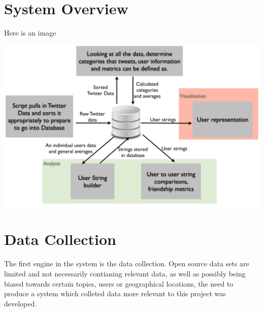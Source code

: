 \section{System Overview}
Here is an image 
\begin{center}
		\includegraphics[scale = 0.55]{./images/architecture.png}
\end{center}
\section{Data Collection}
The first engine in the system is the data collection. Open source data sets are limited and not necessarily contianing relevant data, as well as possibly being biased towards certain topics, users or geographical locations, the need to produce a system which colleted data more relevant to this project was developed. 


